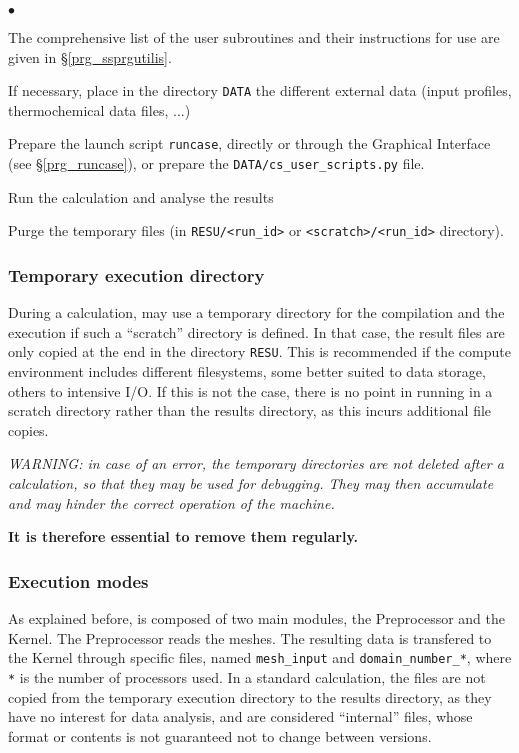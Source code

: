 {{{\begin{list}{$\bullet$}{}
\begin{list}{}{}
\end{list}


The comprehensive list of the user subroutines and their instructions
      for use are given in \S\ref{prg_ssprgutilis}.

\item If necessary, place in the directory \texttt{DATA} the different
      external data (input profiles, thermochemical data files, ...)

\item Prepare the launch script \texttt{runcase}, directly or through the
      Graphical Interface (see \S\ref{prg_runcase}), or prepare the
      \texttt{DATA/cs\_user\_scripts.py} file.

\item Run the calculation and analyse the results

\item Purge the temporary files (in \texttt{RESU/<run\_id>} or
      \texttt{<scratch>/<run\_id>} directory).
\end{list}


\subsubsection{Temporary execution directory}
\label{prg_temporarydirectory}%
During a calculation, \CS may use a temporary directory for the compilation and
the execution if such a ``scratch'' directory is defined. In that case, the
result files are only copied at the end in the directory
\texttt{RESU}. This is recommended if the compute environment includes different
filesystems, some better suited to data storage, others to intensive I/O.
If this is not the case, there is no point in running in a scratch directory
rather than the results directory, as this incurs additional file copies.

\noindent
{\em WARNING: in case of an error, the temporary directories are not deleted
after a calculation, so that they may be used for debugging. They may then
accumulate and may hinder the correct operation of the machine.\\
\centerline{\bf It is therefore essential to remove them regularly.}}


\subsubsection{Execution modes}
\label{prg_executionmodes}%
As explained before, \CS is composed of two main modules, the Preprocessor and the
Kernel. The Preprocessor reads the meshes.
The resulting data is transfered to the Kernel through specific
files, named \texttt{mesh\_input} and \texttt{domain\_number\_*}, where
\texttt{*} is the number of processors used. In a standard calculation, the files
are not copied from the temporary execution directory to the results directory,
as they have no interest for data analysis, and are considered ``internal''
files, whose format or contents is not guaranteed not to change between \CS versions.

}}}
